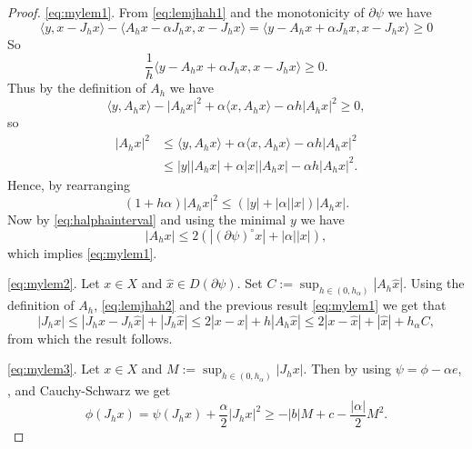 \documentclass[a4paper,11pt, leqno]{scrreprt} %
\renewcommand{\leq}{\leqslant}
\renewcommand{\leq}{\leqslant}
\renewcommand{\geq}{\geqslant}
\theoremstyle{change}
\theoremstyle{nonumberplain}
\newtheorem{proof}{Proof}
\begin{document}
\begin{proof}
\eqref{eq:mylem1}. From \eqref{eq:lemjhah1} and the monotonicity of
$\partial \psi$ we have
\begin{equation*}
\langle y, x - J_h x \rangle - \langle A_h x - \alpha J_h x, x - J_h x
\rangle = \langle y - A_h x + \alpha J_h x, x - J_h x \rangle \geq 0
\end{equation*}
So
\begin{equation*}
  \frac1h \langle y - A_h x + \alpha J_h x, x - J_h x \rangle \geq 0.
\end{equation*}
Thus by the definition of $A_h$ we have 
\begin{equation*}
  \langle y, A_h x \rangle - |A_h x|^2 + \alpha \langle x, A_h x
  \rangle - \alpha h |A_h x|^2 \geq 0,
\end{equation*}
so
\begin{equation*}
  \begin{split}
    |A_h x|^2 &\leq \langle y, A_h x \rangle + \alpha \langle x, A_h x
    \rangle - \alpha h |A_h x|^2\\
    &\leq |y| |A_h x| + \alpha |x||A_h x| - \alpha h |A_h x|^2.
  \end{split}
\end{equation*}
Hence, by rearranging
\begin{equation*}
  (1 + h \alpha) |A_h x|^2 \leq (|y| + |\alpha| |x|)|A_h x|.
\end{equation*}
Now by \eqref{eq:halphainterval} and using the minimal $y$ we have
\begin{equation*}
  |A_h x| \leq 2(|(\partial \psi)^\circ x| + |\alpha| |x|),
\end{equation*}
which implies \eqref{eq:mylem1}.

\eqref{eq:mylem2}. Let $x \in X$ and $\hat x \in D(\partial
\psi)$. Set $C := \sup_{h \in (0, h_\alpha)} |A_h \hat x|$. Using the
definition of $A_h$, \eqref{eq:lemjhah2} and the previous result
\eqref{eq:mylem1} we get that
\begin{equation*}
  |J_h x| \leq |J_h x - J_h \hat x| + |J_h \hat x| \leq 2 |x - \hat x|
  + h|A_h \hat x| \leq 2 |x - \hat x| + |\hat x| + h_\alpha C,
\end{equation*}
from which the result follows.

\eqref{eq:mylem3}. Let $x \in X$ and $M:= \sup_{h \in (0, h_\alpha)}
  |J_h x|$. Then by using $\psi = \phi - \alpha e$,
  ,  and Cauchy-Schwarz we get
\[
  \phi(J_h x) = \psi(J_h x) + \frac\alpha2 |J_h x|^2 \geq -|b|M + c -
  \frac{|\alpha|}2 M^2.
\]
\end{proof}
\end{document}
